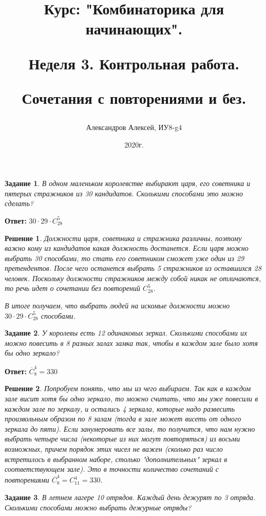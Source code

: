 \documentclass[a4paper,oneside]{memoir}
\title{Курс: "Комбинаторика для начинающих".
	
Неделя 3. Контрольная работа.
	 
Сочетания с повторениями и без.}
\author{Александров Алексей, ИУ8-g4}
\date{2020г.}
\newtheorem{task}{Задание}
\newtheorem{solution}{Решение}
\begin{document}
	
\maketitle

\begin{task}
В одном маленьком королевстве выбирают царя, его советника и пятерых стражников из 30 кандидатов. Сколькими способами это можно сделать?
\end{task}

\textbf{Ответ:} $ 30 \cdot 29 \cdot C_{28}^{5} $

\begin{solution}
Должности царя, советника и стражника различны, поэтому важно кому из кандидатов какая должность достанется. Если царя можно выбрать 30 способами, то стать его советником сможет уже один из 29 претендентов. После чего останется выбрать 5 стражников из оставшихся 28 человек. Поскольку должности стражников между собой никак не отличаются, то речь идет о сочетании без повторений $  C_{28}^5 $.

В итоге получаем, что выбрать людей на искомые должности можно $ 30\cdot 29\cdot C_{28}^5 $ способами.
\end{solution}

\hrulefill

\begin{task}
	У королевы есть 12 одинаковых зеркал. Сколькими способами их можно повесить в 8 разных залах замка так, чтобы в каждом зале было хотя бы одно зеркало?
\end{task}

\textbf{Ответ:} $ \overline{C}_{8}^4 = 330 $

\begin{solution}
	Попробуем понять, что мы из чего выбираем. Так как в каждом зале висит хотя бы одно зеркало, то можно считать, что мы уже повесили в каждом зале по зеркалу, и остались 4 зеркала, которые надо развесить произвольным образом по 8 залам (тогда в зале может висеть от одного зеркала до пяти). Если занумеровать все залы, то получится, что нам нужно выбрать четыре числа (некоторые из них могут повторяться) из восьми возможных, причем порядок этих чисел не важен (сколько раз число встретилось в выбранном наборе, столько "дополнительных" зеркал в соответствующем зале). Это в точности количество сочетаний с повторениями $ \overline{C}_{8}^4 = C_{11}^{4} =330 $.
\end{solution}

\hrulefill
\begin{task}
	В летнем лагере 10 отрядов. Каждый день дежурят по 3 отряда. Сколькими способами можно выбрать дежурные отряды?
\end{task}
\end{document}
